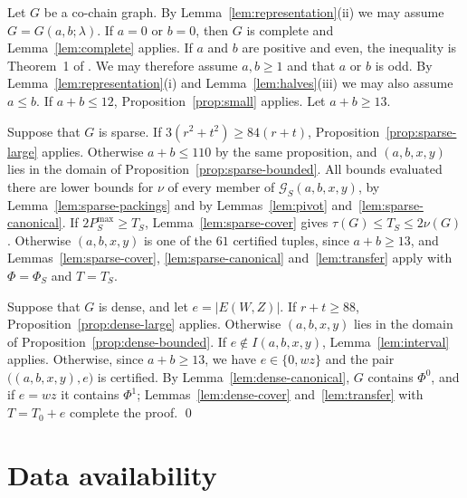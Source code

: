 \documentclass{amsart}
\theoremstyle{definition}
\numberwithin{equation}{section}
\numberwithin{table}{section}
\begin{document}
Let $G$ be a co-chain graph. By Lemma~\ref{lem:representation}(ii) we may assume $G=G(a,b;\lambda)$. If $a=0$ or $b=0$, then $G$ is complete and Lemma~\ref{lem:complete} applies. If $a$ and $b$ are positive and even, the inequality is Theorem~1 of \cite{CG23}. We may therefore assume $a,b\ge 1$ and that $a$ or $b$ is odd. By Lemma~\ref{lem:representation}(i) and Lemma~\ref{lem:halves}(iii) we may also assume $a\le b$. If $a+b\le 12$, Proposition~\ref{prop:small} applies. Let $a+b\ge 13$.

Suppose that $G$ is sparse. If $3(r^2+t^2)\ge 84(r+t)$, Proposition~\ref{prop:sparse-large} applies. Otherwise $a+b\le 110$ by the same proposition, and $(a,b,x,y)$ lies in the domain of Proposition~\ref{prop:sparse-bounded}. All bounds evaluated there are lower bounds for $\nu$ of every member of $\mathcal G_S(a,b,x,y)$, by Lemma~\ref{lem:sparse-packings} and by Lemmas~\ref{lem:pivot} and~\ref{lem:sparse-canonical}. If $2P_S^{\max}\ge T_S$, Lemma~\ref{lem:sparse-cover} gives $\tau(G)\le T_S\le 2\nu(G)$. Otherwise $(a,b,x,y)$ is one of the $61$ certified tuples, since $a+b\ge 13$, and Lemmas~\ref{lem:sparse-cover}, \ref{lem:sparse-canonical} and~\ref{lem:transfer} apply with $\Phi=\Phi_S$ and $T=T_S$.

Suppose that $G$ is dense, and let $e=|E(W,Z)|$. If $r+t\ge 88$, Proposition~\ref{prop:dense-large} applies. Otherwise $(a,b,x,y)$ lies in the domain of Proposition~\ref{prop:dense-bounded}. If $e\notin I(a,b,x,y)$, Lemma~\ref{lem:interval} applies. Otherwise, since $a+b\ge 13$, we have $e\in\{0,wz\}$ and the pair $\bigl((a,b,x,y),e\bigr)$ is certified. By Lemma~\ref{lem:dense-canonical}, $G$ contains $\Phi^0$, and if $e=wz$ it contains $\Phi^1$; Lemmas~\ref{lem:dense-cover} and~\ref{lem:transfer} with $T=T_0+e$ complete the proof. \qed

\appendix

\section{Data availability}\label{app:data}
\end{document}
